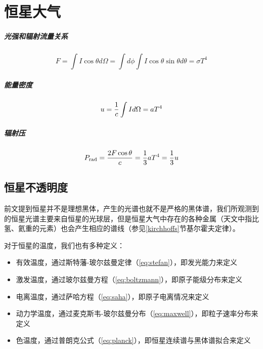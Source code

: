 \chapter{恒星大气}
\paragraph{光强和辐射流量关系}
\begin{equation}
  F=\int I \cos\theta d\Omega=\int d\phi\int I \cos\theta\sin\theta d\theta =\sigma T^4
\end{equation}

\paragraph{能量密度}
\begin{equation}
  u={1\over c}\int I d\Omega=aT^4
\end{equation}

\paragraph{辐射压}
\begin{equation}
  P_\mathrm{rad}={2F \cos{\theta}\over c}={1\over3}aT^4={1\over 3}u
\end{equation}

\section{恒星不透明度}
前文提到恒星并不是理想黑体，产生的光谱也就不是严格的黑体谱，我们所观测到的恒星光谱主要来自恒星的光球层，但是恒星大气中存在的各种金属（天文中指比氢、氦重的元素）也会产生相应的谱线（参见\ref{kirchhoffs}节基尔霍夫定律）。

对于恒星的温度，我们也有多种定义：
\begin{itemize}
  \item 有效温度，通过斯特藩-玻尔兹曼定律（\ref{eq:stefan}），即发光能力来定义
  \item 激发温度，通过玻尔兹曼方程（\ref{eq:boltzmann}），即原子能级分布来定义
  \item 电离温度，通过萨哈方程（\ref{eq:saha}），即原子电离情况来定义
  \item 动力学温度，通过麦克斯韦-玻尔兹曼分布（\ref{eq:maxwell}），即粒子速率分布来定义
  \item 色温度，通过普朗克公式（\ref{eq:planck}），即恒星连续谱与黑体谱拟合来定义
\end{itemize}

